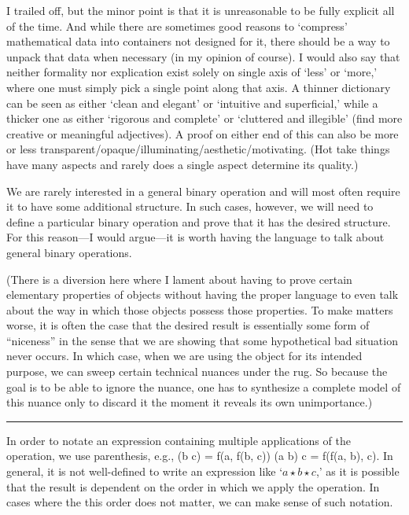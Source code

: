 \documentclass[12pt]{article}
\def\[#1\]{\begin{align*}#1\end{align*}}
\newcommand{\sepline}{\rule{\textwidth}{0.4pt}}
\theoremstyle{definition}
\newcommand{\isp}[1]{\quad\text{#1}\quad}
\newcommand{\<}{\left\langle}
\renewcommand{\>}{\right\rangle}
\begin{document}
I trailed off, but the minor point is that it is unreasonable to be fully explicit all of the time.
And while there are sometimes good reasons to `compress' mathematical data into containers not designed for it, there should be a way to unpack that data when necessary (in my opinion of course).
I would also say that neither formality nor explication exist solely on single axis of `less' or `more,' where one must simply pick a single point along that axis.
A thinner dictionary can be seen as either `clean and elegant' or `intuitive and superficial,' while a thicker one as either `rigorous and complete' or `cluttered and illegible' (find more creative or meaningful adjectives).
A proof on either end of this can also be more or less transparent/opaque/illuminating/aesthetic/motivating.
(Hot take things have many aspects and rarely does a single aspect determine its quality.)

We are rarely interested in a general binary operation and will most often require it to have some additional structure.
In such cases, however, we will need to define a particular binary operation and prove that it has the desired structure.
For this reason---I would argue---it is worth having the language to talk about general binary operations.

(There is a diversion here where I lament about having to prove certain elementary properties of objects without having the proper language to even talk about the way in which those objects possess those properties.
To make matters worse, it is often the case that the desired result is essentially some form of ``niceness'' in the sense that we are showing that some hypothetical bad situation never occurs. In which case, when we are using the object for its intended purpose, we can sweep certain technical nuances under the rug.
So because the goal is to be able to ignore the nuance, one has to synthesize a complete model of this nuance only to discard it the moment it reveals its own unimportance.)

\sepline

In order to notate an expression containing multiple applications of the operation, we use parenthesis, e.g.,
\[
    a \star (b \star c) = f(a, f(b, c)) \isp{and} (a \star b) \star c = f(f(a, b), c).
\]
In general, it is not well-defined to write an expression like `$a \star b \star c$,' as it is possible that the result is dependent on the order in which we apply the operation.
In cases where the this order does not matter, we can make sense of such notation.
\end{document}
